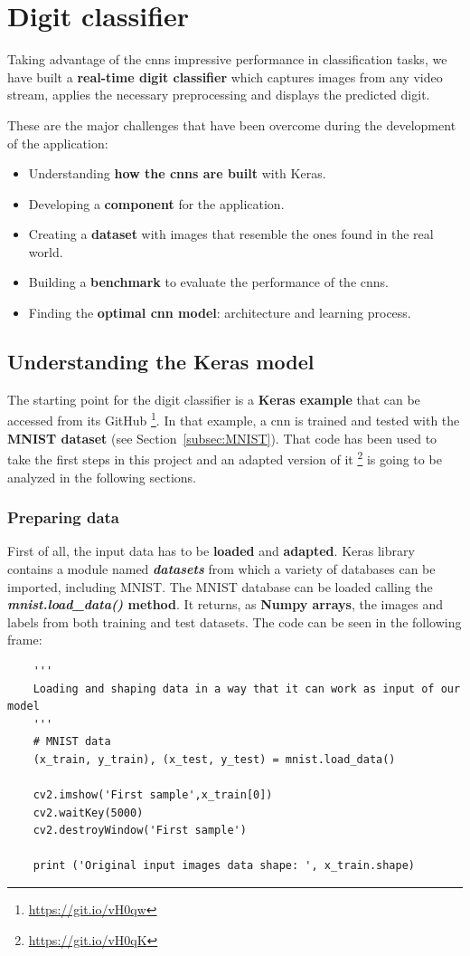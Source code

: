 \chapter{Digit classifier}\label{ch:digitclass}
Taking advantage of the \glspl{cnn} impressive performance in classification tasks, we have built a \textbf{real-time digit classifier} which captures images from any video stream, applies the necessary preprocessing and displays the predicted digit.

These are the major challenges that have been overcome during the development of the application:
\begin{itemize}
	\item Understanding \textbf{how the \glspl{cnn} are built} with Keras.
	\item Developing a \textbf{component} for the application.
	\item Creating a \textbf{dataset} with images that resemble the ones found in the real world.
	\item Building a \textbf{benchmark} to evaluate the performance of the \glspl{cnn}.
	\item Finding the \textbf{optimal \gls{cnn} model}: architecture and learning process.
\end{itemize}

\section{Understanding the Keras model}\label{sec:classifier}
The starting point for the digit classifier is a \textbf{Keras example} that can be accessed from its GitHub \footnote{\url{https://git.io/vH0qw}}. In that example, a \gls{cnn} is trained and tested with the \textbf{MNIST dataset} (see Section~\ref{subsec:MNIST}). That code has been used to take the first steps in this project and an adapted version of it \footnote{\url{https://git.io/vH0qK}} is going to be analyzed in the following sections.

\subsection{Preparing data}\label{subsec:adaptdata}
First of all, the input data has to be \textbf{loaded} and \textbf{adapted}. Keras library contains a module named \textbf{\textit{datasets}} from which a variety of databases can be imported, including MNIST. The MNIST database can be loaded calling the \textbf{\textit{mnist.load\_data()} method}. It returns, as \textbf{Numpy arrays}, the images and labels from both training and test datasets. The code can be seen in the following frame:
\begin{lstlisting}
    '''
    Loading and shaping data in a way that it can work as input of our model
    '''
    # MNIST data
    (x_train, y_train), (x_test, y_test) = mnist.load_data()
    
    cv2.imshow('First sample',x_train[0])
    cv2.waitKey(5000)
    cv2.destroyWindow('First sample')
    
    print ('Original input images data shape: ', x_train.shape) 
\end{lstlisting}

